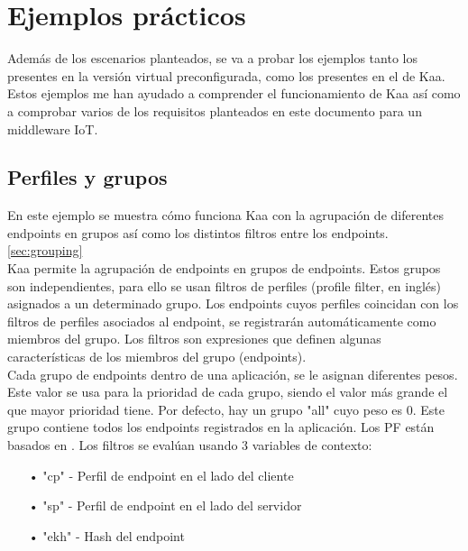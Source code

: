 \documentclass[12pt, twoside]{book}
\newcommand{\MYhref}[3][blue]{\href{#2}{\color{#1}{#3}}}
\begin{document}
\section{Ejemplos prácticos}
Además de los escenarios planteados, se va a probar los ejemplos tanto los presentes en la versión virtual preconfigurada, como los presentes en el \MYhref{https://github.com/kaaproject/sample-apps}{GIT} de Kaa. Estos ejemplos me han ayudado a comprender el funcionamiento de Kaa así como a comprobar varios de los requisitos planteados en este documento para un middleware IoT. 

\subsection{Perfiles y grupos}
En este ejemplo se muestra cómo funciona Kaa con la agrupación de diferentes endpoints en grupos así como los distintos filtros entre los endpoints. \ref{sec:grouping} \\
Kaa permite la agrupación de endpoints en grupos de endpoints. Estos grupos son independientes, para ello se usan filtros de perfiles (profile filter, en inglés) asignados a un determinado grupo. Los endpoints cuyos perfiles coincidan con los filtros de perfiles asociados al endpoint, se registrarán automáticamente como miembros del grupo. Los filtros son expresiones que definen algunas características de los miembros del grupo (endpoints).\\
Cada grupo de endpoints dentro de una aplicación, se le asignan diferentes pesos. Este valor se usa para la prioridad de cada grupo, siendo el valor más grande el que mayor prioridad tiene. Por defecto, hay un grupo "all" cuyo peso es 0. Este grupo contiene todos los endpoints registrados en la aplicación. Los PF están basados en \MYhref{http://docs.spring.io/spring/docs/3.0.x/reference/expressions.html}{Spring Language}. Los filtros se evalúan usando 3 variables de contexto:
\begin{itemize}
\item[•] "cp" - Perfil de endpoint en el lado del cliente
\item[•] "sp" - Perfil de endpoint en el lado del servidor
\item[•] "ekh" - Hash del endpoint 
\end{itemize}
\end{document}
